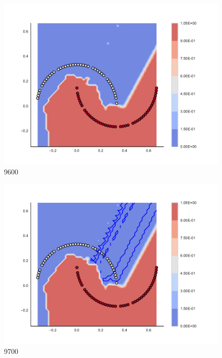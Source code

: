 \begin{subfigure}[b]{0.09\textwidth}
    \includegraphics[clip, trim=2.35cm 1.75cm 4.5cm 0cm,width=\textwidth]{img/convergence/9600.pdf}
    \caption{9600}
    \label{fig:convergence_9600}
\end{subfigure}
%
\begin{subfigure}[b]{0.09\textwidth}
    \includegraphics[clip, trim=2.35cm 1.75cm 4.5cm 0cm,width=\textwidth]{img/convergence/9700.pdf}
    \caption{9700}
    \label{fig:convergence_9700}
\end{subfigure}
%

